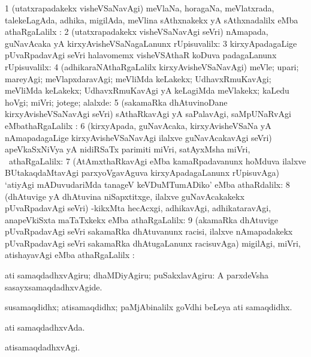 \bentry
{}
\gl{\pUparx}
\bmng
\bnum
\num{1} (utatxrapadakekx visheVSaNavAgi) meVlaNa, horagaNa, meVlatxrada, talekeLagAda, adhika, migilAda, meVlina sAthxnakekx yA sAthxnadalilx eMba athaRgaLalilx \parx:  
\num{2} (utatxrapadakekx visheVSaNavAgi seVri) nAmapada, guNavAcaka yA kirxyAvisheVSaNagaLanunx rUpisuvalilx:  
\num{3} kirxyApadagaLige pUvaRpadavAgi seVri halavomemx visheVSAthaR koDuva padagaLanunx rUpisuvalilx:  
\num{4} (adhikaraNAthaRgaLalilx kirxyAvisheVSaNavAgi) meVle; upari; mareyAgi; meVlapxdaravAgi; meVliMda keLakekx; UdhavxRmuKavAgi; meVliMda keLakekx; UdhavxRmuKavAgi yA keLagiMda meVlakekx; kaLedu hoVgi; miVri; jotege; alalxde:  
\num{5} (sakamaRka dhAtuvinoDane kirxyAvisheVSaNavAgi seVri) sAthaRkavAgi yA saPalavAgi, saMpUNaRvAgi eMbathaRgaLalilx \parx :  
\num{6} (kirxyApada, guNavAcaka, kirxyAvisheVSaNa yA nAmapadagaLige kirxyAvisheVSaNavAgi ilalxve guNavAcakavAgi seVri) apeVkaSxNiVya yA nidiRSaTx parimiti miVri, satAyxMsha miVri, \mo\ athaRgaLalilx:  
\num{7} (AtAmxthaRkavAgi  eMba kamaRpadavanunx hoMduva ilalxve BUtakaqdaMtavAgi parxyoVgavAguva kirxyApadagaLanunx rUpisuvAga) `atiyAgi mADuvudariMda tanageV keVDuMTumADiko' eMba athaRdalilx:  
\num{8} (dhAtuvige yA dhAtuvina niSapxtitxge, ilalxve guNavAcakakekx pUvaRpadavAgi seVri) -kikxMta hecAcxgi, adhikavAgi, adhikataravAgi, anapeVkiSxta maTaTxkekx eMba athaRgaLalilx:  
\num{9} (akamaRka dhAtuvige pUvaRpadavAgi seVri sakamaRka dhAtuvanunx racisi, ilalxve nAmapadakekx pUvaRpadavAgi seVri sakamaRka dhAtugaLanunx racisuvAga) migilAgi, miVri, atishayavAgi eMba athaRgaLalilx \parx:  
\enum
\emng
\eentry

\bentry
{}
\gl{\akirx}
\bmng
ati samaqdadhxvAgiru; dhaMDiyAgiru; puSakxlavAgiru:  A parxdeVsha sasayxsamaqdadhxvAgide. 
\emng
\eentry

\bentry
{}
\gl{\nA}
\bmng
susamaqdidhx; atisamaqdidhx;  paMjAbinalilx goVdhi beLeya ati samaqdidhx. 
\emng
\eentry

\bentry
{}
\gl{\gu}
\bmng
ati samaqdadhxvAda. 
\emng
\eentry

\bentry
{}
\gl{\kirxvi}
\bmng
atisamaqdadhxvAgi. 
\emng
\eentry

